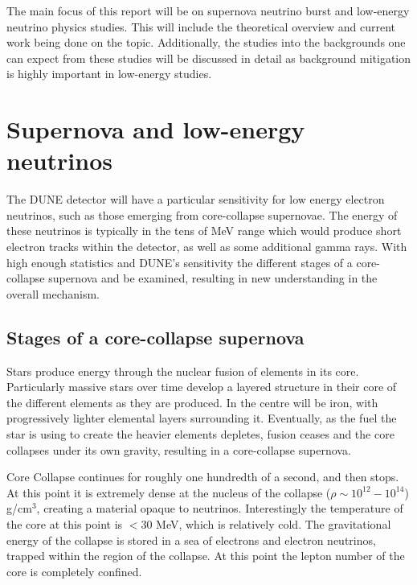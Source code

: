 \noindent The main focus of this report will be on supernova neutrino burst and low-energy neutrino physics studies. 
This will include the theoretical overview and current work being done on the topic.
Additionally, the studies into the backgrounds one can expect from these studies will be discussed in detail as background mitigation is highly important in low-energy studies.


\section{Supernova and low-energy neutrinos}
The DUNE detector will have a particular sensitivity for low energy electron neutrinos, such as those emerging from core-collapse supernovae.
The energy of these neutrinos is typically in the tens of MeV range which would produce short electron tracks within the detector, as well as some additional gamma rays.
With high enough statistics and DUNE's sensitivity the different stages of a core-collapse supernova and be examined, resulting in new understanding in the overall mechanism.

\subsection{Stages of a core-collapse supernova}
Stars produce energy through the nuclear fusion of elements in its core.
Particularly massive stars over time develop a layered structure in their core of the different elements as they are produced. 
In the centre will be iron, with progressively lighter elemental layers surrounding it. 
Eventually, as the fuel the star is using to create the heavier elements depletes, fusion ceases and the core collapses under its own gravity, resulting in a core-collapse supernova.

Core Collapse continues for roughly one hundredth of a second, and then stops.
At this point it is extremely dense at the nucleus of the collapse ($\rho \sim 10^{12} - 10^{14}$) g/cm$^{3}$, creating a material opaque to neutrinos.
Interestingly the temperature of the core at this point is $< 30$ MeV, which is relatively cold.
The gravitational energy of the collapse is stored in a sea of electrons and electron neutrinos, trapped within the region of the collapse.
At this point the lepton number of the core is completely confined.

